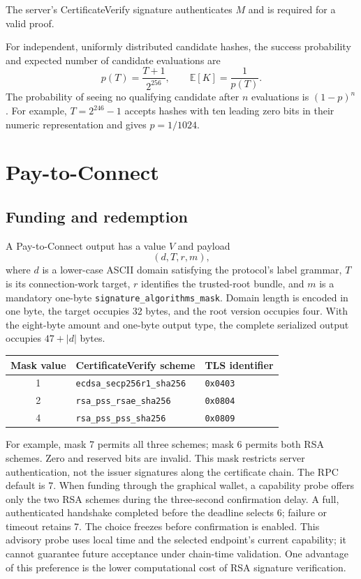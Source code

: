 \documentclass[11pt,a4paper]{article}
\begin{document}
The server's CertificateVerify signature authenticates $M$ and is required
for a valid proof.

For independent, uniformly distributed candidate hashes, the success
probability and expected number of candidate evaluations are
\begin{equation}
  p(T)=\frac{T+1}{2^{256}}, \qquad \mathbb{E}[K]=\frac{1}{p(T)}.
  \label{eq:probability}
\end{equation}
The probability of seeing no qualifying candidate after $n$ evaluations is
$(1-p)^n$. For example, $T=2^{246}-1$ accepts hashes with ten leading zero
bits in their numeric representation and gives $p=1/1024$.

\section{Pay-to-Connect}

\subsection*{Funding and redemption}

A Pay-to-Connect output has a value $V$ and payload
\begin{equation}
  (d,T,r,m),
\end{equation}
where $d$ is a lower-case ASCII domain satisfying the protocol's label grammar,
$T$ is its connection-work target, $r$ identifies the trusted-root bundle, and
$m$ is a mandatory one-byte \texttt{signature\_algorithms\_mask}.
Domain length is encoded in one byte, the target occupies 32 bytes, and the
root version occupies four. With the eight-byte amount and one-byte output
type, the complete serialized output occupies $47+|d|$ bytes.

\begin{center}
\begin{tabular}{@{}cll@{}}
\toprule
Mask value & CertificateVerify scheme & TLS identifier \\
\midrule
1 & \texttt{ecdsa\_secp256r1\_sha256} & \texttt{0x0403} \\
2 & \texttt{rsa\_pss\_rsae\_sha256} & \texttt{0x0804} \\
4 & \texttt{rsa\_pss\_pss\_sha256} & \texttt{0x0809} \\
\bottomrule
\end{tabular}
\end{center}

For example, mask 7 permits all three schemes; mask 6 permits both RSA schemes. Zero and
reserved bits are invalid. This mask restricts server authentication, not
the issuer signatures along the certificate chain. The RPC default is 7.
When funding through the graphical wallet, a capability probe offers only
the two RSA schemes during the three-second confirmation delay. A full,
authenticated handshake completed before the deadline selects 6; failure or
timeout retains 7. The choice freezes before confirmation is enabled.
This advisory probe uses local time and the selected endpoint's current
capability; it cannot guarantee future acceptance under chain-time validation.
One advantage of this preference is the lower computational cost of RSA
signature verification.
\end{document}
